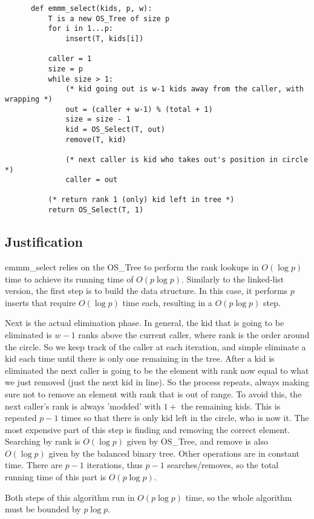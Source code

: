 \documentclass[a4paper,12pt]{article}
\begin{document}
\begin{enumerate}[a)]
\begin{verbatim}
      def emmm_select(kids, p, w):
          T is a new OS_Tree of size p
          for i in 1...p:
              insert(T, kids[i])

          caller = 1
          size = p
          while size > 1:
              (* kid going out is w-1 kids away from the caller, with wrapping *)
              out = (caller + w-1) % (total + 1)
              size = size - 1
              kid = OS_Select(T, out)
              remove(T, kid)

              (* next caller is kid who takes out's position in circle *)
              caller = out

          (* return rank 1 (only) kid left in tree *)
          return OS_Select(T, 1)

    \end{verbatim}

\subsection*{Justification}

emmm\_select relies on the OS\_Tree to perform the rank lookups in $O(\log
p)$ time to achieve its running time of $O(p\log p)$. Similarly to the
linked-list version, the first step is to build the data structure. In
this case, it performs $p$ inserts that require $O(\log p)$ time each,
resulting in a $O(p\log p)$ step.


Next is the actual elimination phase. In general, the kid that is
going to be eliminated is $w-1$ ranks above the current caller, where
rank is the order around the circle. So we keep track of the caller at
each iteration, and simple eliminate a kid each time until there is
only one remaining in the tree. After a kid is eliminated the next
caller is going to be the element with rank now equal to what we just
removed (just the next kid in line). So the process repeats, always
making sure not to remove an element with rank that is out of
range. To avoid this, the next caller's rank is always 'modded' with
$1 + $ the remaining kids. This is repeated $p-1$ times so that there
is only kid left in the circle, who is now it. The most expensive
part of this step is finding and removing the correct
element. Searching by rank is $O(\log p)$ given by OS\_Tree, and
remove is also $O(\log p)$ given by the balanced binary tree. Other
operations are in constant time. There are $p-1$ iterations, thus
$p-1$ searches/removes, so the total running time of this
part is $O(p\log p)$.


Both steps of this algorithm run in $O(p\log p)$ time, so the
whole algorithm must be bounded by $p\log p$.

\end{enumerate}
\end{document}
